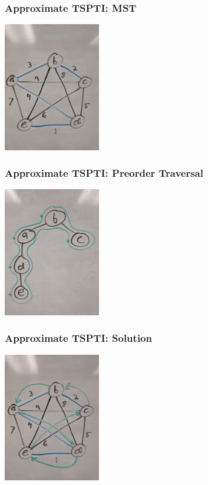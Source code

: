 \documentclass[10pt,aspectratio=169]{beamer}
\begin{document}
  \begin{frame} \frametitle{Approximate TSPTI: MST}
    \begin{center}
      \includegraphics[height=160pt]{13-tspti-mst.jpg}
    \end{center}
  \end{frame}
  
  \begin{frame} \frametitle{Approximate TSPTI: Preorder Traversal}
    \begin{center}
      \includegraphics[height=160pt]{13-tspti-preorder.jpg}
    \end{center}
  \end{frame}
  
  \begin{frame} \frametitle{Approximate TSPTI: Solution}
    \begin{center}
      \includegraphics[height=160pt]{13-tspti-output.jpg}
    \end{center}
  \end{frame}
  
\end{document}
